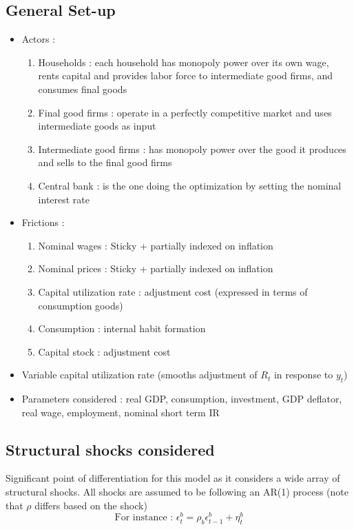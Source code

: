\documentclass{article}
\begin{document}
\subsection{General Set-up}
\begin{itemize}
    \item Actors : 
    \begin{enumerate}
        \item Households : each household has monopoly power over its own wage, rents capital and provides labor force to intermediate good firms, and consumes final goods 
        \item Final good firms : operate in a perfectly competitive market and uses intermediate goods as input
        \item Intermediate good firms : has monopoly power over the good it produces and sells to the final good firms 
        \item Central bank : is the one doing the optimization by setting the nominal interest rate 
    \end{enumerate}
    \item Frictions : 
    \begin{enumerate}
        \item Nominal wages : Sticky + partially indexed on inflation
        \item Nominal prices : Sticky + partially indexed on inflation
        \item Capital utilization rate : adjustment cost (expressed in terms of consumption goods)
        \item Consumption : internal habit formation
        \item Capital stock : adjustment cost 
    \end{enumerate}
    \item Variable capital utilization rate (smooths adjustment of $R_t$ in response to $y_t$)
    \item Parameters considered : real GDP, consumption, investment, GDP deflator, real wage, employment, nominal short term IR
\end{itemize}

\subsection{Structural shocks considered}
Significant point of differentiation for this model as it considers a wide array of structural shocks.
All shocks are assumed to be following an AR(1) process (note that $\rho$ differs based on the shock)
\begin{equation}
    \text{For instance : } \epsilon_t^b = \rho_b\epsilon_{t-1}^b + \eta_t^b
\end{equation}
\end{document}
